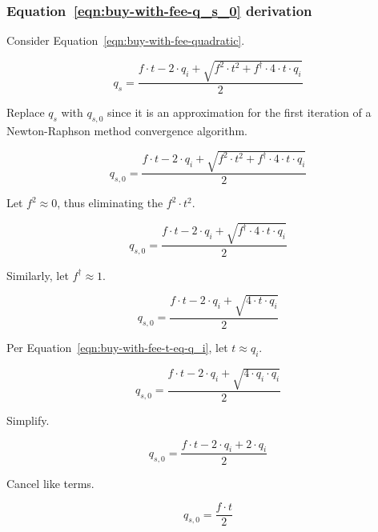 \subsubsection{Equation~\ref{eqn:buy-with-fee-q_s_0} derivation}%
\label{sssec:equation-eqn-buy-with-fee-q-s-0-derivation}

Consider Equation~\ref{eqn:buy-with-fee-quadratic}.

\begin{equation*}
	q_s = \frac{f \cdot t - 2 \cdot q_i +
		\sqrt{f^2 \cdot t^2 + f^{\dagger} \cdot 4 \cdot t \cdot q_i}}{2}
\end{equation*}

Replace $q_s$ with $q_{s, 0}$ since it is an approximation for the first iteration of a
Newton-Raphson method convergence algorithm.

\begin{equation*}
	q_{s, 0} = \frac{f \cdot t - 2 \cdot q_i +
		\sqrt{f^2 \cdot t^2 + f^{\dagger} \cdot 4 \cdot t \cdot q_i}}{2}
\end{equation*}

Let $f^2 \approx 0$, thus eliminating the $f^2 \cdot t^2$.

\begin{equation*}
	q_{s, 0} = \frac{f \cdot t - 2 \cdot q_i + \sqrt{f^{\dagger} \cdot 4 \cdot t \cdot q_i}}{2}
\end{equation*}

Similarly, let $f^{\dagger} \approx 1$.

\begin{equation*}
	q_{s, 0} = \frac{f \cdot t - 2 \cdot q_i + \sqrt{4 \cdot t \cdot q_i}}{2}
\end{equation*}

Per Equation~\ref{eqn:buy-with-fee-t-eq-q_i}, let $t \approx q_i$.

\begin{equation*}
	q_{s, 0} = \frac{f \cdot t - 2 \cdot q_i + \sqrt{4 \cdot q_i \cdot q_i}}{2}
\end{equation*}

Simplify.

\begin{equation*}
	q_{s, 0} = \frac{f \cdot t - 2 \cdot q_i + 2 \cdot q_i}{2}
\end{equation*}

Cancel like terms.

\begin{equation*}
	q_{s, 0} = \frac{f \cdot t}{2}
\end{equation*}

